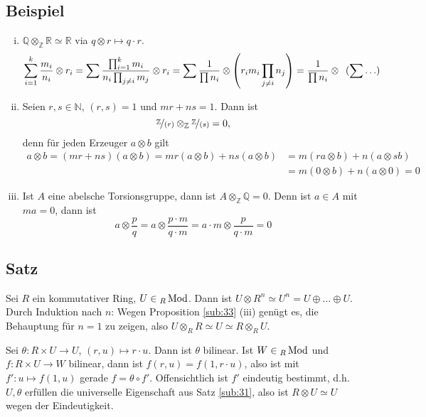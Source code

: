 \subsection[Beispiele zu Tensorprodukten]{Beispiel} %
\label{sub:34}
\begin{enumerate}[(i)]
	\item $\mathds{Q} \otimes_\mathds{Z} \mathds{R} \simeq \mathds{R}$ via $q \otimes r \mapsto q \cdot r$.
	\begin{align*}
		\sum_{i=1}^{k} \frac{m_i}{n_i} \otimes r_i = \sum \frac{\prod_{i=1}^k m_i}{n_i \prod_{j \not= i} m_j} \otimes r_i  = \sum \frac{1}{\prod n_i} \otimes
		\enbrace*{r_i m_i \prod_{j\not= i} n_j} = \frac{1}{\prod n_i} \otimes \enspace(\sum \ldots )   
	\end{align*}
	\item Seien $r,s \in \mathds{N}$, $(r,s)=1$ und $m r + n s =1$. Dann ist 
	\[
		\nicefrac{\mathds{Z}}{(r)} \otimes_\mathds{Z} \nicefrac{\mathds{Z}}{(s)} = 0,
	\]
	denn für jeden Erzeuger $a \otimes b$ gilt 
	\begin{align*}
		a \otimes b = (m r + n s) (a \otimes b) = m r (a \otimes b) + n s (a \otimes b) &= m( r a \otimes b) + n(a \otimes  s b) \\&= m(0 \otimes b) + n( a \otimes 0) = 0
	\end{align*}
	\item Ist $A$ eine abelsche Torsionsgruppe, dann ist $A \otimes_\mathds{Z} \mathds{Q} = 0$. Denn ist $a \in A$ mit $m a = 0$, dann ist 
	\[
		a \otimes  \frac{p}{q} = a \otimes \frac{p \cdot m}{q \cdot m} = a \cdot m \otimes \frac{p}{q \cdot m} = 0  
	\]
\end{enumerate}

\subsection[Satz: Tensorprodukt eines $R$-Moduls und $R^n$]{Satz} %
\label{sub:35}
Sei $R$ ein kommutativer Ring, $U \in {_R \Mod}$. Dann ist $U \otimes R^n \simeq U^n= U \oplus \ldots \oplus U$. 
Durch Induktion nach $n$: Wegen Proposition \ref{sub:33} (iii) genügt es, die Behauptung für $n=1$ zu zeigen, also $U \otimes_R R \simeq U \simeq R \otimes_R U$.

Sei $\theta : R \times U \to U$, $(r,u) \mapsto r \cdot u$. Dann ist $\theta$ bilinear. Ist $W \in {_R  \Mod}$ und $f : R \times U  \to W$ bilinear, dann ist 
$f(r,u)= f(1, r \cdot u)$, also ist mit $f' : u \mapsto f(1,u)$ gerade $f = \theta \circ f'$. Offensichtlich ist $f'$ eindeutig bestimmt, d.h. $U, \theta$ erfüllen
die universelle Eigenschaft aus Satz \ref{sub:31}, also ist $R \otimes U \simeq U$ wegen der Eindeutigkeit. \bewende


